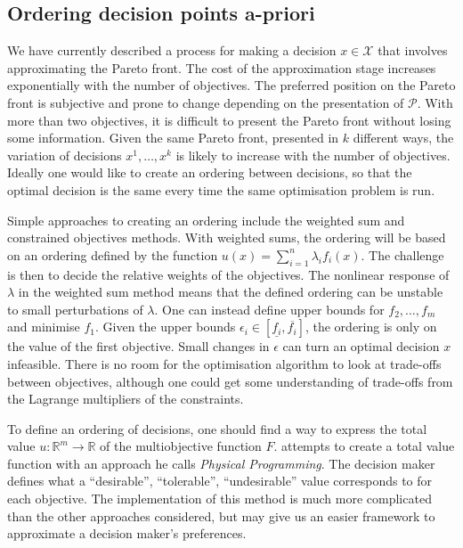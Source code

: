 \documentclass[main.tex]{subfiles}
\begin{document}
\subsection{Ordering decision points a-priori}\label{sec:multi_apriori}
We have currently described a process for making a decision
$x\in\mathcal{X}$ that involves approximating the Pareto
front.
The cost of the approximation stage increases exponentially with the
number of objectives. The preferred position on the Pareto front is
subjective and prone to change depending on the presentation of
$\mathcal{P}$. With more than two objectives, it is difficult to
present the Pareto front without losing some information.
Given the same Pareto front, presented in
$k$ different ways, the variation of decisions $x^1,\dots,x^k$ is likely to
increase with the number of objectives.
Ideally one would like to create an ordering between decisions, so
that the optimal decision is the same every time the same optimisation
problem is run.

Simple approaches to creating an ordering include the weighted sum
and constrained objectives methods.
With weighted sums, the ordering will be based on
an ordering defined by the function $u(x)=\sum_{i=1}^n\lambda_if_i(x)$.
The challenge is then to decide the relative weights of the objectives. The
nonlinear response of $\lambda$ in the weighted sum method means that
the defined ordering can be unstable to small perturbations of $\lambda$.
One can instead define upper bounds for $f_2,\dots,f_m$ and minimise
$f_1$.
Given the upper bounds
$\epsilon_i\in[\underline{f_i},\overline{f_i}]$,
the ordering is only on the value of the first objective.
Small changes in $\epsilon$ can turn an optimal decision $x$
infeasible. There is no room for the optimisation algorithm to
look at trade-offs between objectives, although one could get some
understanding of trade-offs from the
Lagrange multipliers of the constraints.

To define an ordering of decisions, one should find a way to express
the total value $u:\mathbb{R}^m\to\mathbb{R}$ of the multiobjective
function $F$.
\citet{messac1996physical} attempts to create a total value function
with an approach he calls \emph{Physical Programming}. The decision
maker defines what a ``desirable'', ``tolerable'',
``undesirable'' value corresponds to for each objective. The implementation of this method
is much more complicated than the other approaches considered, but
may give us an easier framework to approximate a decision maker's preferences.
\end{document}
